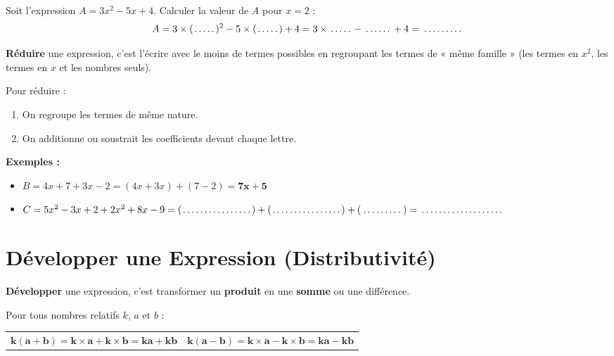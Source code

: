 \begin{cadreexemple}
Soit l'expression $A = 3x^2 - 5x + 4$. Calculer la valeur de $A$ pour $x = 2$ :
\[ A = 3 \times (\pointille[0.8cm])^2 - 5 \times (\pointille[0.8cm]) + 4 = 3 \times \pointille[0.8cm] - \pointille[1cm] + 4 = \pointille[1.5cm] \]
\end{cadreexemple}

\begin{cadredef}
\textbf{Réduire} une expression, c'est l'écrire avec le moins de termes possibles en regroupant les termes de « même famille » (les termes en $x^2$, les termes en $x$ et les nombres seuls).
\end{cadredef}

\begin{cadremethode}
Pour réduire :
\begin{enumerate}
    \item On regroupe les termes de même nature.
    \item On additionne ou soustrait les coefficients devant chaque lettre.
\end{enumerate}

\textbf{Exemples :}
\begin{itemize}
    \item $B = 4x + 7 + 3x - 2 = (4x + 3x) + (7 - 2) = \mathbf{7x + 5}$
    \item $C = 5x^2 - 3x + 2 + 2x^2 + 8x - 9 = (\pointille[2.5cm]) + (\pointille[2.5cm]) + (\pointille[1.5cm]) = \pointille[3cm]$
\end{itemize}
\end{cadremethode}

\section{Développer une Expression (Distributivité)}

\begin{cadredef}[Développer]
\textbf{Développer} une expression, c'est transformer un \textbf{produit} en une \textbf{somme} ou une différence.
\end{cadredef}

\begin{cadreprop}
Pour tous nombres relatifs $k$, $a$ et $b$ :
\begin{center}
\renewcommand{\arraystretch}{1.6}
\begin{tabularx}{\linewidth}{X|X}
\rowcolor{colDefBg}
\centering $\mathbf{k(a + b) = k \times a + k \times b = ka + kb}$ & \centering $\mathbf{k(a - b) = k \times a - k \times b = ka - kb}$ \tabularnewline
\end{tabularx}
\end{center}
\end{cadreprop}

